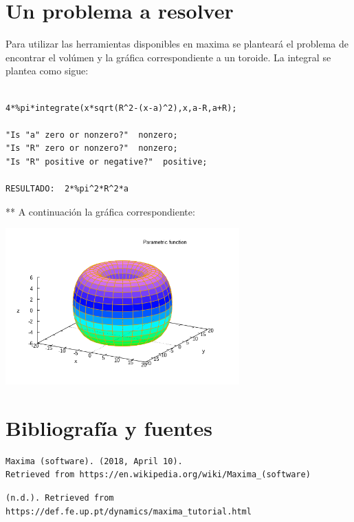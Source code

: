 \documentclass{article} %
\begin{document}
\section{Un problema a resolver}

Para utilizar las herramientas disponibles en maxima se planteará el problema de encontrar el volúmen y la gráfica correspondiente a un toroide. La integral se plantea como sigue:

\begin{verbatim} 

4*%pi*integrate(x*sqrt(R^2-(x-a)^2),x,a-R,a+R);

"Is "a" zero or nonzero?"  nonzero;
"Is "R" zero or nonzero?"  nonzero;
"Is "R" positive or negative?"  positive;

RESULTADO:  2*%pi^2*R^2*a

\end{verbatim}

** A continuación la gráfica correspondiente:

\begin{center}

	\includegraphics[width=9cm]{toroide.png}
    
\end{center}




\section*{Bibliografía y fuentes}

\begin{verbatim} 
Maxima (software). (2018, April 10). 
Retrieved from https://en.wikipedia.org/wiki/Maxima_(software) 
\end{verbatim}


\begin{verbatim} 
(n.d.). Retrieved from https://def.fe.up.pt/dynamics/maxima_tutorial.html
\end{verbatim}
\end{document}
